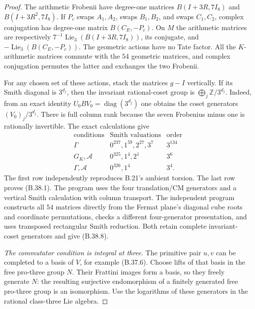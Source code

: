 \begin{proof}
The arithmetic Frobenii have degree-one matrices
$B(I+3R,7I_8)$ and $B(I+3R^2,7I_8)$.
If $P_c$ swaps $A_1,A_2$, swaps $B_1,B_2$, and swaps
$C_1,C_2$, complex conjugation has degree-one matrix
$B(C_E,-P_c)$.
On $M$ the arithmetic matrices are respectively
$7^{-1}\operatorname{Lie}_3(B(I+3R,7I_8))$,
its conjugate, and $-\operatorname{Lie}_3(B(C_E,-P_c))$.
The geometric actions have no Tate factor.
All the $K$-arithmetic matrices commute with the $54$
geometric matrices, and complex conjugation permutes
the latter and exchanges the two Frobenii.

For any chosen set of these actions, stack the matrices
$g-I$ vertically. If its Smith diagonal is $3^{d_j}$,
then the invariant rational-coset group is
$\bigoplus_j\mathbb Z/3^{d_j}$.
Indeed, from an exact identity
$U_0 B V_0=\operatorname{diag}(3^{d_j})$ one obtains
the coset generators $(V_0)_j/3^{d_j}$.
There is full column rank because the seven Frobenius
minus one is rationally invertible.
The exact calculations give
\[
 \begin{array}{c|l|c}
 \text{conditions}&\text{Smith valuations}&\text{order}\\ \hline
 \Gamma&0^{237},1^{59},2^{27},3^7&3^{134}\\
 G_K,\mathcal A&0^{325},1^4,2^1&3^6\\
 \Gamma,\mathcal A&0^{326},1^4&3^4.
 \end{array}                                                  \tag{B.38.8}
\]
The first row independently reproduces B.21's ambient
torsion. The last row proves (B.38.1).
The program  uses
the four translation/CM generators and a vertical
Smith calculation with column transport.
The independent program 
constructs all $54$ matrices directly from the Fermat
plane's diagonal cube roots and coordinate permutations,
checks a different four-generator presentation, and
uses transposed rectangular Smith reduction.
Both retain complete invariant-coset generators and
give (B.38.8).

\emph{The commutator condition is integral at three.}
The primitive pair $u,v$ can be completed to a basis
of $V$, for example (B.37.6). Choose lifts of that basis
in the free pro-three group $N$.
Their Frattini images form a basis, so they freely
generate $N$: the resulting surjective endomorphism
of a finitely generated free pro-three group is an
isomorphism. Use the logarithms of these generators
in the rational class-three Lie algebra.


\end{proof}
